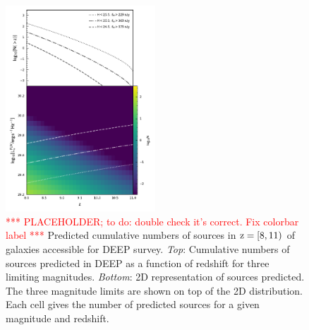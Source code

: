 \begin{figure}
	\centering
	\includegraphics[width=0.5\textwidth]{figures/density/density.pdf}
	\caption{\textcolor{red}{*** PLACEHOLDER; to do: double check it's correct. Fix colorbar label *** }{Predicted cumulative numbers of sources in $\rm z = [8, 11)$ of galaxies accessible for \euclid \:\textsc{DEEP} survey. \textit{Top}: Cumulative numbers of sources predicted in \euclid \:\textsc{DEEP} as a function of redshift for three limiting magnitudes. \textit{Bottom}: 2D representation of sources predicted. The three magnitude limits are shown on top of the 2D distribution. Each cell gives the number of predicted sources for a given magnitude and redshift.} 
	\label{fig:density:lfe}}
\end{figure}